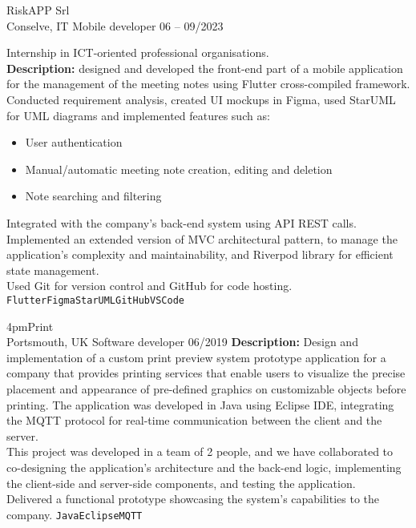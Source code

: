 \documentclass[9pt]{developercv} %
\begin{document}
\begin{entrylist}
	\entry
		{RiskAPP Srl\\\footnotesize{Conselve, IT}}
		{Mobile developer}
		{06 -- 09/2023}
		{Internship in ICT-oriented professional organisations. \\
		\textbf{Description:} designed and developed the front-end part of a mobile application for the management of the meeting notes using Flutter cross-compiled framework. Conducted requirement analysis, created UI mockups in Figma, used StarUML for UML diagrams and implemented features such as:
		\begin{itemize}
			\item User authentication
			\item Manual/automatic meeting note creation, editing and deletion
			\item Note searching and filtering
		\end{itemize}
		Integrated with the company's back-end system using API REST calls. Implemented an extended version of MVC architectural pattern, to manage the application's complexity and maintainability, and Riverpod library for efficient state management. \\
		Used Git for version control and GitHub for code hosting. \\
 		\texttt{Flutter}\slashsep\texttt{Figma}\slashsep\texttt{StarUML}\slashsep\texttt{GitHub}\slashsep\texttt{VSCode}}
	\entry
		{4pmPrint\\\footnotesize{Portsmouth, UK}}
		{Software developer}
		{06/2019}
		{\textbf{Description:} Design and implementation of a custom print preview system prototype application for a company that provides printing services that enable users to visualize the precise placement and appearance of pre-defined graphics on customizable objects before printing. The application was developed in Java using Eclipse IDE, integrating the MQTT protocol for real-time communication between the client and the server. \\
		This project was developed in a team of 2 people, and we have collaborated to co-designing the application's architecture and the back-end logic, implementing the client-side and server-side components, and testing the application. \\
		Delivered a functional prototype showcasing the system's capabilities to the company.
		\texttt{Java}\slashsep\texttt{Eclipse}\slashsep\texttt{MQTT}}
\end{entrylist}

\end{document}
